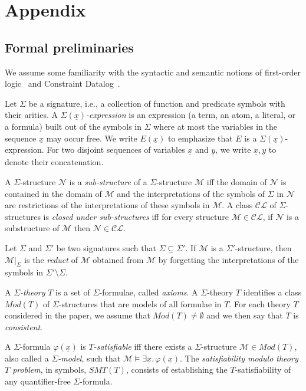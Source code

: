 \documentclass[conference]{llncs}
\begin{document}
{\section{Appendix}
\label{appx}
\subsection{Formal preliminaries}
\label{app:infprelim}

We assume some familiarity with the syntactic and semantic notions of
first-order logic~\cite{enderton} and Constraint
Datalog~\cite{constraintdatalog}.

Let $\Sigma$ be a signature, i.e., a collection of function and predicate symbols with their arities. 
A \emph{$\Sigma(\underline{x})$-expression} is an expression (a term, an
atom, a literal, or a formula) built out of the symbols in $\Sigma$
where at most the variables in the sequence $\underline{x}$ may occur
free. 
We write $E(\underline{x})$ to emphasize that $E$ is a
$\Sigma(\underline{x})$-expression. 
For two disjoint sequences of
variables $\underline{x}$ and $\underline{y}$, we write
$\underline{x},\underline{y}$ to denote their concatenation. 

A $\Sigma$-structure $\mathcal{N}$ is a \emph{sub-structure} of a
$\Sigma$-structure $\mathcal{M}$ iff the domain of $\mathcal{N}$ is
contained in the domain of $\mathcal{M}$ and the interpretations of
the symbols of $\Sigma$ in $\mathcal{N}$ are restrictions of the
interpretations of these symbols in $\mathcal{M}$. A class
$\mathcal{CL}$ of $\Sigma$-structures is \emph{closed under
  sub-structures} iff for every structure $\mathcal{M}\in
\mathcal{CL}$, if $\mathcal{N}$ is a substructure of $\mathcal{M}$
then $\mathcal{N}\in \mathcal{CL}$. 

Let $\Sigma$ and $\Sigma'$ be two
signatures such that $\Sigma\subseteq \Sigma'$. If $\mathcal{M}$ is a
$\Sigma'$-structure, then $\mathcal{M}|_{\Sigma}$ is the \emph{reduct}
of $\mathcal{M}$ obtained from $\mathcal{M}$ by forgetting the
interpretations of the symbols in $\Sigma'\setminus \Sigma$.

A \emph{$\Sigma$-theory} $T$ is a set of $\Sigma$-formulae, called
\emph{axioms}. A $\Sigma$-theory $T$ identifies a class
$\mathit{Mod}(T)$ of $\Sigma$-structures that are models of all
formulae in $T$. For each theory $T$ considered in the paper, we
assume that $\mathit{Mod}(T)\neq \emptyset$ and we then say that $T$
is \emph{consistent}. 

A $\Sigma$-formula $\varphi(\underline{x})$ is
\emph{$T$-satisfiable} iff there exists a $\Sigma$-structure
$\mathcal{M}\in \mathit{Mod}(T)$, also called a \emph{$\Sigma$-model},
such that $\mathcal{M} \models \exists \underline{x}.\,
\varphi(\underline{x})$. The \emph{satisfiability modulo theory $T$
  problem}, in symbols, $\mathit{SMT}(T)$, consists of establishing
the $T$-satisfiability of any quantifier-free $\Sigma$-formula. 

}
\end{document}
